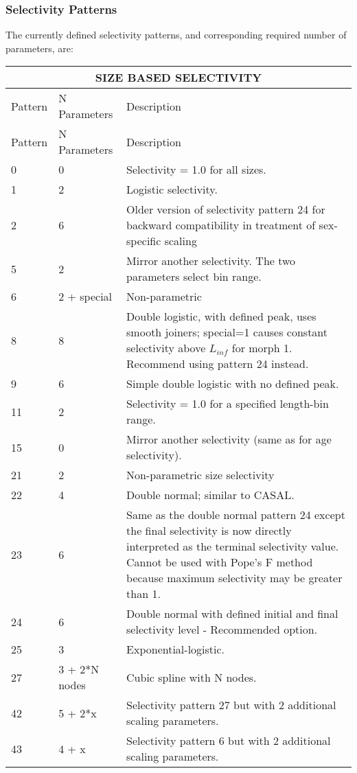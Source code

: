 \hypertarget{SelexPattern}{}
\subsubsection{Selectivity Patterns}
The currently defined selectivity patterns, and corresponding required number of parameters, are:


\begin{longtable}{p{2cm} p{3cm} p{10cm}}
	\multicolumn{3}{c}{SIZE BASED SELECTIVITY} \Bstrut\\	
	\endfirsthead

	\hline
	Pattern & N Parameters & Description \Tstrut\Bstrut\\
	\hline
	\endhead

	\hline
	\endfoot
	\endlastfoot

	\hline
		
	Pattern & N Parameters & Description \Tstrut\Bstrut\\
	\hline
	0 \Tstrut & 0 & Selectivity = 1.0 for all sizes. \\
	1 \Tstrut & 2 & Logistic selectivity. \\
	2 \Tstrut & 6 & Older version of selectivity pattern 24 for backward compatibility in treatment of sex-specific scaling \\
	5 \Tstrut & 2 & Mirror another selectivity. The two parameters select bin range. \\
	6 \Tstrut & 2 + special & Non-parametric \\
	8 \Tstrut & 8 & Double logistic, with defined peak, uses smooth joiners; special=1 causes constant selectivity above $L_{inf}$ for morph 1. Recommend using pattern 24 instead. \\
	9 \Tstrut & 6 & Simple double logistic with no defined peak. \\
	11 \Tstrut & 2 & Selectivity = 1.0 for a specified length-bin range. \\
	15 \Tstrut & 0 & Mirror another selectivity (same as for age selectivity). \\
	21 \Tstrut & 2 & Non-parametric size selectivity \\
	22 \Tstrut & 4 & Double normal; similar to CASAL. \\
	23 \Tstrut & 6 & Same as the double normal pattern 24 except the final selectivity is now directly interpreted as the terminal selectivity value. Cannot be used with Pope's F method because maximum selectivity may be greater than 1. \\
	24 \Tstrut & 6 & Double normal with defined initial and final selectivity level - Recommended option. \\
	25 \Tstrut & 3 & Exponential-logistic. \\
	27 \Tstrut & 3 + 2*N nodes & Cubic spline with N nodes. \\
	42 \Tstrut & 5 + 2*x & Selectivity pattern 27 but with 2 additional scaling parameters. \\
	43 \Tstrut & 4 + x & Selectivity pattern 6 but with 2 additional scaling parameters. \Bstrut\\
	\hline
\end{longtable}


